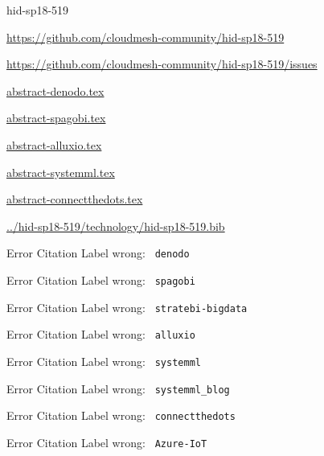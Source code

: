 \begin{IU}

hid-sp18-519

\url{https://github.com/cloudmesh-community/hid-sp18-519}

\url{https://github.com/cloudmesh-community/hid-sp18-519/issues}

\href{https://github.com/cloudmesh-community/hid-sp18-519/blob/master//technology/abstract-denodo.tex}{abstract-denodo.tex}

\href{https://github.com/cloudmesh-community/hid-sp18-519/blob/master//technology/abstract-spagobi.tex}{abstract-spagobi.tex}

\href{https://github.com/cloudmesh-community/hid-sp18-519/blob/master//technology/abstract-alluxio.tex}{abstract-alluxio.tex}

\href{https://github.com/cloudmesh-community/hid-sp18-519/blob/master//technology/abstract-systemml.tex}{abstract-systemml.tex}

\href{https://github.com/cloudmesh-community/hid-sp18-519/blob/master//technology/abstract-connectthedots.tex}{abstract-connectthedots.tex}

\href{https://github.com/cloudmesh-community/hid-sp18-519/blob/master//technology/hid-sp18-519.bib}{../hid-sp18-519/technology/hid-sp18-519.bib}

 Error Citation Label wrong: \verb| denodo |

 Error Citation Label wrong: \verb| spagobi |

 Error Citation Label wrong: \verb| stratebi-bigdata |

 Error Citation Label wrong: \verb| alluxio |

 Error Citation Label wrong: \verb| systemml |

 Error Citation Label wrong: \verb| systemml_blog |

 Error Citation Label wrong: \verb| connectthedots |

 Error Citation Label wrong: \verb| Azure-IoT |

\end{IU}


